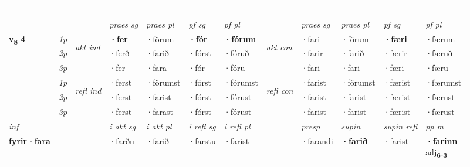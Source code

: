 \begin{longtable}[l]{X>{\footnotesize\itshape}llXXXXlXXXX}
\midrule
  & \\*
    & \\*
   & \\*
  & \\
   \midrule
 & &   & \textit{praes sg}  & \textit{praes pl}    & \textit{ pf sg} & \textit{pf pl} & & \textit{praes sg}  & \textit{praes pl}    & \textit{pf sg} & \textit{pf pl }  \\ \cmidrule{4-7} \cmidrule{9-12}
 \multirow{2}{*}{{{\textbf{v{\textsubscript{8}}} \Large{\textbf{4}}}}}  & 1p & \multirow{3}{*}{\begin{turn}{90}\textit{akt ind}\end{turn}} & \textbf{·fer} & ·förum & \textbf{·fór} & \textbf{·fórum} & \multirow{3}{*}{\begin{turn}{90}\textit{akt con}\end{turn}} &·fari & ·förum & \textbf{·færi} & ·færum\\*
 & 2p &  &  ·ferð  & ·farið & ·fórst & ·fóruð & & ·farir & ·farið & ·færir & ·færuð \\*
 & 3p &  & ·fer & ·fara & ·fór & ·fóru & & ·fari & ·fari& ·færi & ·færu \\*
\cmidrule{4-7} \cmidrule{9-12}
 & 1p & \multirow{3}{*}{\begin{turn}{90}\textit{refl ind}\end{turn}}  & ·ferst & ·förumst & ·fórst & ·fórumst & \multirow{3}{*}{\begin{turn}{90}\textit{refl con}\end{turn}}  &·farist & ·förumst & ·færist & ·færumst \\*
 & 2p &  & ·ferst & ·farist & ·fórst & ·fórust & &·farist & ·farist & ·færist & ·færust \\*
 & 3p  & & ·ferst & ·farast & ·fórst & ·fórust & & ·farist & ·farist& ·færist & ·færust \\*
\cmidrule{4-7} \cmidrule{9-12}

   {\textit{inf}} & &  & \textit{i akt sg} & \textit{i akt pl} & \textit{i refl sg} & \textit{i refl pl} && \textit{presp} & \textit{supin} & \textit{supin refl} & \textit{pp m} \\*
  {\textbf{fyrir\allowbreak ·fara}} & && ·farðu  & ·farið & ·farstu & ·farist && ·farandi &  \textbf{·farið} & ·farist & \specialcell{\textbf{·farinn} \\ adj\textbf{\textsubscript{6-3}}} \\*

\midrule


\end{longtable}
